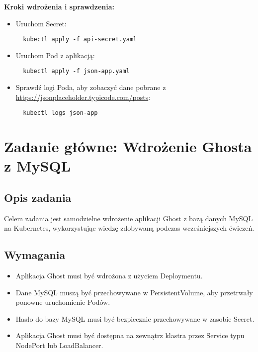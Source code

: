 \documentclass{article}
\begin{document}
\textbf{Kroki wdrożenia i sprawdzenia:}
\begin{itemize}
  \item Uruchom Secret:
  \begin{lstlisting}
  kubectl apply -f api-secret.yaml
  \end{lstlisting}
  \item Uruchom Pod z aplikacją:
  \begin{lstlisting}
  kubectl apply -f json-app.yaml
  \end{lstlisting}
  \item Sprawdź logi Poda, aby zobaczyć dane pobrane z \url{https://jsonplaceholder.typicode.com/posts}:
  \begin{lstlisting}
  kubectl logs json-app
  \end{lstlisting}
\end{itemize}

\section{Zadanie główne: Wdrożenie Ghosta z MySQL}
\subsection{Opis zadania}
Celem zadania jest samodzielne wdrożenie aplikacji Ghost z bazą danych MySQL na Kubernetes, wykorzystując wiedzę zdobywaną podczas wcześniejszych ćwiczeń.

\subsection{Wymagania}
\begin{itemize}
  \item Aplikacja Ghost musi być wdrożona z użyciem Deploymentu.
  \item Dane MySQL muszą być przechowywane w PersistentVolume, aby przetrwały ponowne uruchomienie Podów.
  \item Hasło do bazy MySQL musi być bezpiecznie przechowywane w zasobie Secret.
  \item Aplikacja Ghost musi być dostępna na zewnątrz klastra przez Service typu NodePort lub LoadBalancer.
\end{itemize}
\end{document}
